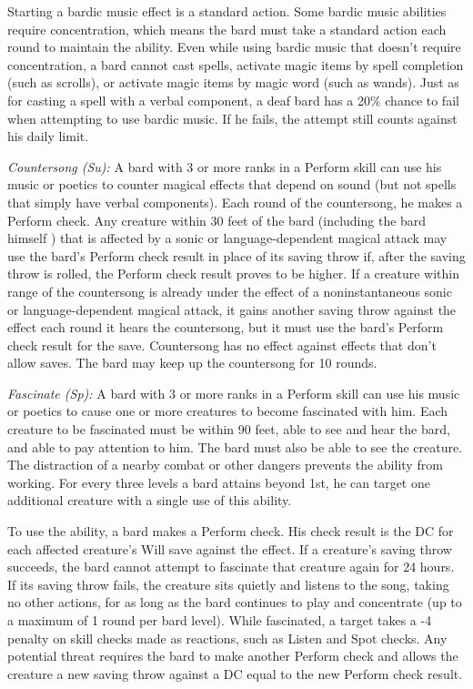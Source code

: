 \documentclass{article}
\begin{document}
Starting a bardic music effect is a standard action. Some bardic music abilities 
require concentration, which means the bard must take a standard action each round 
to maintain the ability. Even while using bardic music that doesn't require concentration, 
a bard cannot cast spells, activate magic items by spell completion (such as scrolls), 
or activate magic items by magic word (such as wands). Just as for casting a spell 
with a verbal component, a deaf bard has a 20\% chance to fail when attempting 
to use bardic music. If he fails, the attempt still counts against his daily limit.

\textit{Countersong (Su): }A bard with 3 or more ranks in a Perform skill can use 
his music or poetics to counter magical effects that depend on sound (but not spells 
that simply have verbal components). Each round of the countersong, he makes a 
Perform check. Any creature within 30 feet of the bard (including the bard himself 
) that is affected by a sonic or language-dependent magical attack may use the 
bard's Perform check result in place of its saving throw if, after the saving throw 
is rolled, the Perform check result proves to be higher. If a creature within range 
of the countersong is already under the effect of a noninstantaneous sonic or language-dependent 
magical attack, it gains another saving throw against the effect each round it 
hears the countersong, but it must use the bard's Perform check result for the 
save. Countersong has no effect against effects that don't allow saves. The bard 
may keep up the countersong for 10 rounds.

\textit{Fascinate (Sp): }A bard with 3 or more ranks in a Perform skill can use 
his music or poetics to cause one or more creatures to become fascinated with him. 
Each creature to be fascinated must be within 90 feet, able to see and hear the 
bard, and able to pay attention to him. The bard must also be able to see the creature. 
The distraction of a nearby combat or other dangers prevents the ability from working. 
For every three levels a bard attains beyond 1st, he can target one additional 
creature with a single use of this ability.

To use the ability, a bard makes a Perform check. His check result is the DC for 
each affected creature's Will save against the effect. If a creature's saving throw 
succeeds, the bard cannot attempt to fascinate that creature again for 24 hours. 
If its saving throw fails, the creature sits quietly and listens to the song, taking 
no other actions, for as long as the bard continues to play and concentrate (up 
to a maximum of 1 round per bard level). While fascinated, a target takes a -4 
penalty on skill checks made as reactions, such as Listen and Spot checks. Any 
potential threat requires the bard to make another Perform check and allows the 
creature a new saving throw against a DC equal to the new Perform check result.
\end{document}
